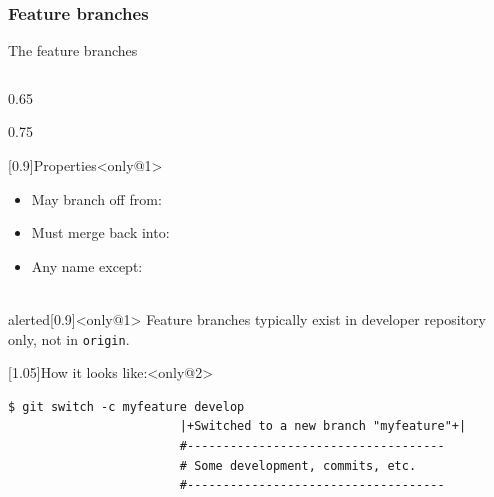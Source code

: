 \subsubsection{Feature branches}
\begin{frame}[fragile,c]{The feature branches}
    \begin{columns}[c]
        \begin{column}{0.65\textwidth}
            \vspace*{-1cm}
            \begin{overlayarea}{\textwidth}{0.75\textheight}
                \begin{varblock}{}[0.9\textwidth]{Properties}<only@1>
                    \begin{itemize}
                        \item May branch off from:\\
                        \quad{\small\develop}
                        \item Must merge back into:\\
                        \quad{\small\develop}
                        \item Any name except:\\
                        \quad{\small\main,\;\develop}\\[-1mm]
                        \quad{\small\release,\;\hotfix}
                    \end{itemize}
                \end{varblock}
                \vspace{-1mm}
                \begin{varblock}{alerted}[0.9\textwidth]{}<only@1>
                    \small \alert{Feature branches typically exist in developer repository only, not in \texttt{origin}.}
                \end{varblock}
                \vspace{3mm}
                \begin{varblock}{}[1.05\textwidth]{How it looks like:}<only@2>
                    \setlength{\medskipamount}{0pt}
                    \begin{lstlisting}[style=MyBash]
                        $ git switch -c myfeature develop
                        |+Switched to a new branch "myfeature"+|
                        #------------------------------------
                        # Some development, commits, etc.
                        #------------------------------------

\end{lstlisting}
\end{varblock}
\end{overlayarea}
\end{column}
\end{columns}
\end{frame}
